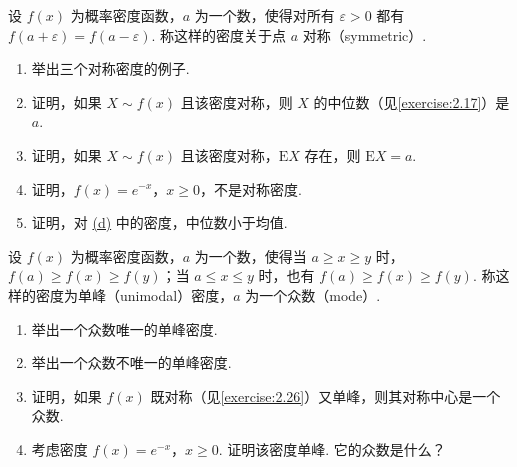 \begin{exercise}\label{exercise:2.26}
设 $f(x)$ 为概率密度函数，$a$ 为一个数，使得对所有 $\varepsilon>0$ 都有 $f(a+\varepsilon)=f(a-\varepsilon)$. 称这样的密度关于点 $a$ 对称（symmetric）.
\begin{enumerate}
\item[(a)] 举出三个对称密度的例子.
\item[(b)] 证明，如果 $X\sim f(x)$ 且该密度对称，则 $X$ 的中位数（见\autoref{exercise:2.17}）是 $a$.
\item[(c)] 证明，如果 $X\sim f(x)$ 且该密度对称，$\mathrm EX$ 存在，则 $\mathrm EX=a$.
\item[(d)]\label{itm:exercise:2.26:d} 证明，$f(x)=e^{-x}$，$x\ge0$，不是对称密度.
\item[(e)] 证明，对 \hyperref[itm:exercise:2.26:d]{(d)} 中的密度，中位数小于均值.
\end{enumerate}
\end{exercise}
\begin{exercise}\label{exercise:2.27}
设 $f(x)$ 为概率密度函数，$a$ 为一个数，使得当 $a\ge x\ge y$ 时，$f(a)\ge f(x)\ge f(y)$；当 $a\le x\le y$ 时，也有 $f(a)\ge f(x)\ge f(y)$. 称这样的密度为单峰（unimodal）密度，$a$ 为一个众数（mode）.
\begin{enumerate}
\item[(a)] 举出一个众数唯一的单峰密度.
\item[(b)] 举出一个众数不唯一的单峰密度.
\item[(c)] 证明，如果 $f(x)$ 既对称（见\autoref{exercise:2.26}）又单峰，则其对称中心是一个众数.
\item[(d)] 考虑密度 $f(x)=e^{-x}$，$x\ge0$. 证明该密度单峰. 它的众数是什么？
\end{enumerate}
\end{exercise}
